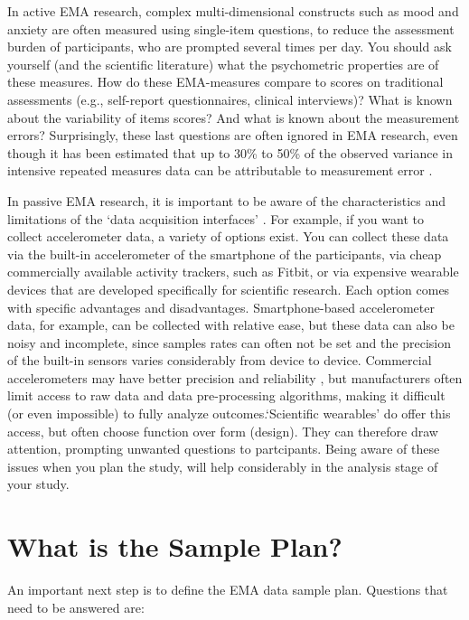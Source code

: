 \documentclass[]{book}
\begin{document}
In active EMA research, complex multi-dimensional constructs such as
mood and anxiety are often measured using single-item questions, to
reduce the assessment burden of participants, who are prompted several
times per day. You should ask yourself (and the scientific literature)
what the psychometric properties are of these measures. How do these
EMA-measures compare to scores on traditional assessments (e.g.,
self-report questionnaires, clinical interviews)? What is known about
the variability of items scores? And what is known about the measurement
errors? Surprisingly, these last questions are often ignored in EMA
research, even though it has been estimated that up to 30\% to 50\% of
the observed variance in intensive repeated measures data can be
attributable to measurement error \citep{Schuurman2015}.

In passive EMA research, it is important to be aware of the
characteristics and limitations of the `data acquisition interfaces'
\citep{Stone2002}. For example, if you want to collect accelerometer
data, a variety of options exist. You can collect these data via the
built-in accelerometer of the smartphone of the participants, via cheap
commercially available activity trackers, such as Fitbit, or via
expensive wearable devices that are developed specifically for
scientific research. Each option comes with specific advantages and
disadvantages. Smartphone-based accelerometer data, for example, can be
collected with relative ease, but these data can also be noisy and
incomplete, since samples rates can often not be set and the precision
of the built-in sensors varies considerably from device to device.
Commercial accelerometers may have better precision and reliability
\citep[see, e.g.,][]{Evenson2015}, but manufacturers often limit access
to raw data and data pre-processing algorithms, making it difficult (or
even impossible) to fully analyze outcomes.`Scientific wearables' do
offer this access, but often choose function over form (design). They
can therefore draw attention, prompting unwanted questions to
partcipants. Being aware of these issues when you plan the study, will
help considerably in the analysis stage of your study.

\section{What is the Sample Plan?}\label{what-is-the-sample-plan}


An important next step is to define the EMA data sample plan. Questions
that need to be answered are:
\end{document}
